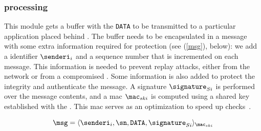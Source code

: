 \subsubsection{\Sender processing}

This module gets a buffer with the \texttt{DATA} to be transmitted to a particular application placed behind \sieveq.
The buffer needs to be encapsulated in a message with some extra information required for protection (see (\ref{msg}), below): we add a \sender identifier $\senderi_i$ and a sequence number \sn that is incremented on each message.
This information is needed to prevent replay attacks, either from the network or from a compromised \presieve.
Some information is also added to protect the integrity and authenticate the message.
A signature $\signature_{Si}$ is performed over the message contents, and a \gls{mac} $\mac_{ski}$ is computed using a shared key established with the \presieve.
This \gls{mac} serves as an optimization to speed up checks~\cite{Clement:2009}.

\begin{equation}
\msg = \langle \senderi_i, \sn, \texttt{DATA}, \signature_{Si} \rangle_{\mac_{ski}}
\label{msg}
\end{equation}

